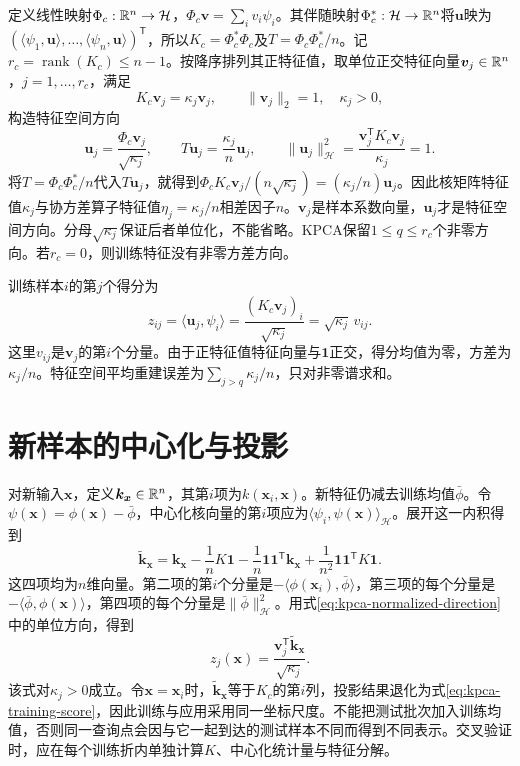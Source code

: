 定义线性映射$\Phi_c:\mathbb{R}^n\to\mathcal H$，$\Phi_c\bm v=\sum_i v_i\psi_i$。其伴随映射$\Phi_c^*:\mathcal H\to\mathbb{R}^n$将$\bm u$映为$(\langle\psi_1,\bm u\rangle,\ldots,\langle\psi_n,\bm u\rangle)^{\mathsf T}$，所以$K_c=\Phi_c^*\Phi_c$及$T=\Phi_c\Phi_c^*/n$。记$r_c=\operatorname{rank}(K_c)\le n-1$。按降序排列其正特征值，取单位正交特征向量$\bm v_j\in\mathbb{R}^n$，$j=1,\ldots,r_c$，满足
\begin{equation}
 K_c\bm v_j=\kappa_j\bm v_j,\qquad
 \|\bm v_j\|_2=1,\quad\kappa_j>0,
\end{equation}
构造特征空间方向
\begin{equation}
 \bm u_j=\frac{\Phi_c\bm v_j}{\sqrt{\kappa_j}},\qquad
 T\bm u_j=\frac{\kappa_j}{n}\bm u_j,
 \qquad \|\bm u_j\|_{\mathcal H}^2
 =\frac{\bm v_j^{\mathsf T}K_c\bm v_j}{\kappa_j}=1.
 \label{eq:kpca-normalized-direction}
\end{equation}
将$T=\Phi_c\Phi_c^*/n$代入$T\bm u_j$，就得到$\Phi_cK_c\bm v_j/(n\sqrt{\kappa_j})=(\kappa_j/n)\bm u_j$。因此核矩阵特征值$\kappa_j$与协方差算子特征值$\eta_j=\kappa_j/n$相差因子$n$。$\bm v_j$是样本系数向量，$\bm u_j$才是特征空间方向。分母$\sqrt{\kappa_j}$保证后者单位化，不能省略。KPCA保留$1\le q\le r_c$个非零方向。若$r_c=0$，则训练特征没有非零方差方向。

训练样本$i$的第$j$个得分为
\begin{equation}
 z_{ij}=\langle\bm u_j,\psi_i\rangle
 =\frac{(K_c\bm v_j)_i}{\sqrt{\kappa_j}}
 =\sqrt{\kappa_j}\,v_{ij}.
 \label{eq:kpca-training-score}
\end{equation}
这里$v_{ij}$是$\bm v_j$的第$i$个分量。由于正特征值特征向量与$\bm1$正交，得分均值为零，方差为$\kappa_j/n$。特征空间平均重建误差为$\sum_{j>q}\kappa_j/n$，只对非零谱求和。

\section{新样本的中心化与投影}
对新输入$\bm x$，定义$\bm k_{\bm x}\in\mathbb{R}^n$，其第$i$项为$k(\bm x_i,\bm x)$。新特征仍减去训练均值$\bar\phi$。令$\psi(\bm x)=\phi(\bm x)-\bar\phi$，中心化核向量的第$i$项应为$\langle\psi_i,\psi(\bm x)\rangle_{\mathcal H}$。展开这一内积得到
\begin{equation}
 \tilde{\bm k}_{\bm x}=\bm k_{\bm x}-\frac1nK\bm1
 -\frac1n\bm1\bm1^{\mathsf T}\bm k_{\bm x}
 +\frac1{n^2}\bm1\bm1^{\mathsf T}K\bm1.
 \label{eq:kpca-test-centering}
\end{equation}
这四项均为$n$维向量。第二项的第$i$个分量是$-\langle\phi(\bm x_i),\bar\phi\rangle$，第三项的每个分量是$-\langle\bar\phi,\phi(\bm x)\rangle$，第四项的每个分量是$\|\bar\phi\|_{\mathcal H}^2$。用式\eqref{eq:kpca-normalized-direction}中的单位方向，得到
\begin{equation}
 z_j(\bm x)=\frac{\bm v_j^{\mathsf T}\tilde{\bm k}_{\bm x}}{\sqrt{\kappa_j}}.
 \label{eq:kpca-new-score}
\end{equation}
该式对$\kappa_j>0$成立。令$\bm x=\bm x_i$时，$\tilde{\bm k}_{\bm x}$等于$K_c$的第$i$列，投影结果退化为式\eqref{eq:kpca-training-score}，因此训练与应用采用同一坐标尺度。不能把测试批次加入训练均值，否则同一查询点会因与它一起到达的测试样本不同而得到不同表示。交叉验证时，应在每个训练折内单独计算$K$、中心化统计量与特征分解。


